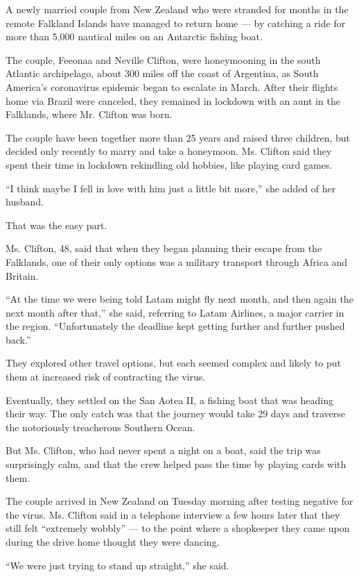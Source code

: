 A newly married couple from New Zealand who were stranded for months in
the remote Falkland Islands have managed to return home --- by catching
a ride for more than 5,000 nautical miles on an Antarctic fishing boat.

The couple, Feeonaa and Neville Clifton, were honeymooning in the south
Atlantic archipelago, about 300 miles off the coast of Argentina, as
South America's coronavirus epidemic began to escalate in March. After
their flights home via Brazil were canceled, they remained in lockdown
with an aunt in the Falklands, where Mr. Clifton was born.

The couple have been together more than 25 years and raised three
children, but decided only recently to marry and take a honeymoon. Ms.
Clifton said they spent their time in lockdown rekindling old hobbies,
like playing card games.

``I think maybe I fell in love with him just a little bit more,'' she
added of her husband.

That was the easy part.

Ms. Clifton, 48, said that when they began planning their escape from
the Falklands, one of their only options was a military transport
through Africa and Britain.

``At the time we were being told Latam might fly next month, and then
again the next month after that,'' she said, referring to Latam
Airlines, a major carrier in the region. ``Unfortunately the deadline
kept getting further and further pushed back.''

They explored other travel options, but each seemed complex and likely
to put them at increased risk of contracting the virus.

Eventually, they settled on the San Aotea II, a fishing boat that was
heading their way. The only catch was that the journey would take 29
days and traverse the notoriously treacherous Southern Ocean.

But Ms. Clifton, who had never spent a night on a boat, said the trip
was surprisingly calm, and that the crew helped pass the time by playing
cards with them.

The couple arrived in New Zealand on Tuesday morning after testing
negative for the virus. Ms. Clifton said in a telephone interview a few
hours later that they still felt ``extremely wobbly'' --- to the point
where a shopkeeper they came upon during the drive home thought they
were dancing.

``We were just trying to stand up straight,'' she said.

